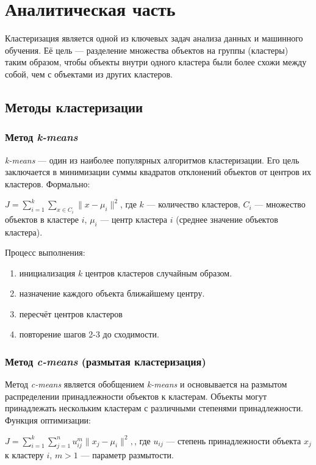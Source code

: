\chapter{Аналитическая часть}

Кластеризация является одной из ключевых задач анализа данных и машинного обучения. 
Её цель — разделение множества объектов на группы (кластеры) таким образом, 
чтобы объекты внутри одного кластера были более схожи между собой, чем с объектами из других кластеров. 

\section{Методы кластеризации}

\subsection{Метод \textit{k-means}}
\textit{k-means} — один из наиболее популярных алгоритмов кластеризации. 
Его цель заключается в минимизации суммы квадратов отклонений объектов от центров их кластеров. 
Формально:

\begin{math}
J = \sum_{i=1}^k \sum_{x \in C_i} \|x - \mu_i\|^2
\end{math}\cite{lib:kmeans},
где $k$ — количество кластеров, $C_i$ — множество объектов в кластере $i$, $\mu_i$ — центр кластера $i$ (среднее значение объектов кластера).

Процесс выполнения:
\begin{enumerate}
    \item инициализация $k$ центров кластеров случайным образом.
    \item назначение каждого объекта ближайшему центру.
    \item пересчёт центров кластеров
    \item повторение шагов 2-3 до сходимости.
\end{enumerate}

\subsection{Метод \textit{c-means} (размытая кластеризация)}
Метод \textit{c-means} является обобщением \textit{k-means} и основывается на размытом распределении принадлежности объектов к кластерам. 
Объекты могут принадлежать нескольким кластерам с различными степенями принадлежности. 
Функция оптимизации:

\begin{math}
J = \sum_{i=1}^k \sum_{j=1}^n u_{ij}^m \|x_j - \mu_i\|^2,
\end{math}\cite{lib:cmeans}, где $u_{ij}$ — степень принадлежности объекта $x_j$ к кластеру $i$, $m > 1$ — параметр размытости.


